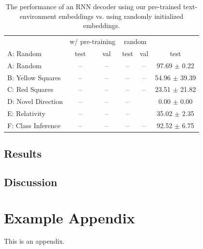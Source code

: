 \documentclass[11pt]{article}
\begin{document}
\begin{table}
\begin{center}
\begin{tabularx}{\textwidth}{ l|ccccc }
\toprule
\multicolumn{1}{c}{} 
& \multicolumn{2}{c}{w/ pre-training}  
& \multicolumn{2}{c}{random}
& \multicolumn{1}{c}{\cite{ruis2020benchmark}}\\
A: Random & test  & val  & test &  val & test \\
\midrule
A: Random & --  & --  & -- &  -- & 97.69 $\pm$ 0.22\\
B: Yellow Squares & --  & --  & -- &  -- & 54.96 $\pm$ 39.39\\
C: Red Squares & --  & --  & -- &  -- & 23.51 $\pm$ 21.82\\
D: Novel Direction & --  & --  & -- &  & 0.00 $\pm$ 0.00 \\
E: Relativity & --  & --  & -- & & 35.02 $\pm$ 2.35 \\
F: Class Inference & --  & --  & -- &  -- & 92.52 $\pm$ 6.75 \\
\bottomrule
\end{tabularx}
\end{center}
\caption{The performance of an RNN decoder using our pre-trained text-environment embeddings vs. using randomly initialized embeddings.}
\label{tab:baseline_results}
\end{table}

\subsection{Results}

\subsection{Discussion}






\appendix

\section{Example Appendix}
\label{sec:appendix}

This is an appendix.
\end{document}
